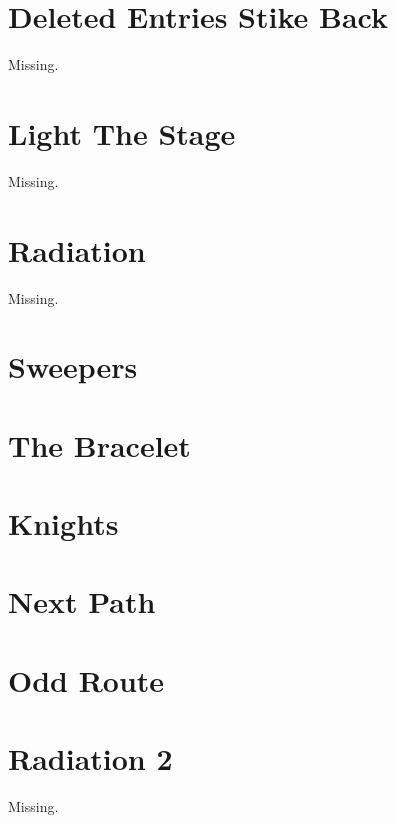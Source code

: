 \documentclass[a4paper, 10pt]{article}
\let\stdsection\section
\renewcommand\section{\newpage\stdsection}
\newcommand{\includecode}[1]{
    }
\begin{document}
    
    \section{Deleted Entries Stike Back}
        Missing.
        
    \section{Light The Stage}
        Missing.
        
    \section{Radiation}
        Missing.
        
    \section{Sweepers}
        \includecode{../problems/w12/Sweepers/Sweepers1.cpp}
        
    \section{The Bracelet}
        \includecode{../problems/w12/The_Bracelet/TheBracelet1.cpp}
        
    
    \section{Knights}
        \includecode{../problems/w13/Knights/Knights1.cpp}
        
    \section{Next Path}
        \includecode{../problems/w13/NextPath/NextPath1.cpp}
        
    \section{Odd Route}
        \includecode{../problems/w13/OddRoute/OddRoute1.cpp}
        
    \section{Radiation 2}
        Missing.
    
\end{document}
